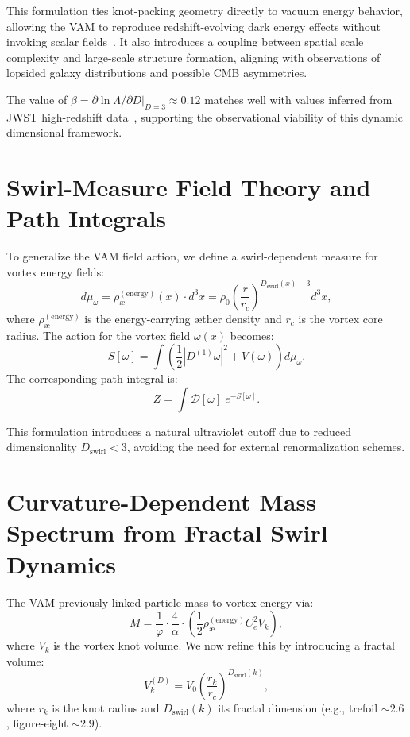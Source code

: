 \documentclass[12pt]{article}
\begin{document}
    This formulation ties knot-packing geometry directly to vacuum energy behavior, allowing the VAM to reproduce redshift-evolving dark energy effects without invoking scalar fields~\cite{vam2024swirl}. It also introduces a coupling between spatial scale complexity and large-scale structure formation, aligning with observations of lopsided galaxy distributions and possible CMB asymmetries.

    The value of \( \beta = \partial \ln \Lambda / \partial D \big|_{D=3} \approx 0.12 \) matches well with values inferred from JWST high-redshift data~\cite{zhou2025drfsmt}, supporting the observational viability of this dynamic dimensional framework.

    \section{Swirl-Measure Field Theory and Path Integrals}

    To generalize the VAM field action, we define a swirl-dependent measure for vortex energy fields:
    \[
        d\mu_\omega = \rho_\text{\ae}^{(\text{energy})}(x) \cdot d^3x = \rho_0 \left( \frac{r}{r_c} \right)^{D_\text{swirl}(x) - 3} d^3x,
    \]
    where \( \rho_\text{\ae}^{(\text{energy})} \) is the energy-carrying æther density and \( r_c \) is the vortex core radius. The action for the vortex field \( \omega(x) \) becomes:
    \[
        S[\omega] = \int \left( \frac{1}{2} |D^{(1)} \omega|^2 + V(\omega) \right) d\mu_\omega.
    \]
    The corresponding path integral is:
    \[
        Z = \int \mathcal{D}[\omega] \; e^{-S[\omega]}.
    \]

    This formulation introduces a natural ultraviolet cutoff due to reduced dimensionality \( D_\text{swirl} < 3 \), avoiding the need for external renormalization schemes.

    \section{Curvature-Dependent Mass Spectrum from Fractal Swirl Dynamics}

    The VAM previously linked particle mass to vortex energy via:
    \[
        M = \frac{1}{\varphi} \cdot \frac{4}{\alpha} \cdot \left( \frac{1}{2} \rho_\text{\ae}^{(\text{energy})} C_e^2 V_k \right),
    \]
    where \( V_k \) is the vortex knot volume. We now refine this by introducing a fractal volume:
    \[
        V_k^{(D)} = V_0 \left( \frac{r_k}{r_c} \right)^{D_\text{swirl}(k)},
    \]
    where \( r_k \) is the knot radius and \( D_\text{swirl}(k) \) its fractal dimension (e.g., trefoil \( \sim 2.6 \), figure-eight \( \sim 2.9 \)).
\end{document}
